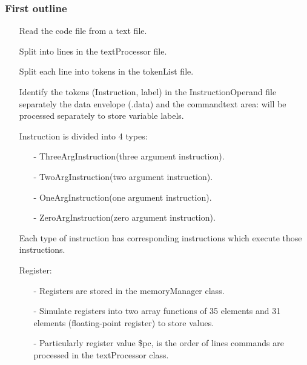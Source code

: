 \documentclass[10pt]{article}
\begin{document}
\begin{large}
    	\subsubsection{First outline}
    	    \begin{itemize}
            	\item[]
            	    Read the code file from a text file.
            	\item[]
            	    Split into lines in the textProcessor file.
            	\item[]
            	    Split each line into tokens in the tokenList file.
            	\item[]
            	    Identify the tokens (Instruction, label) in the InstructionOperand file separately the data envelope (.data) and the commandtext area: will be processed separately to store variable labels.
            	\item[]
            	    Instruction is divided into 4 types:
            	\begin{itemize}
                	\item[-]
                	    ThreeArgInstruction(three argument instruction).
                	\item[-]
                	    TwoArgInstruction(two argument instruction).
                	\item[-]
                	    OneArgInstruction(one argument instruction).
                	\item[-]
                	    ZeroArgInstruction(zero argument instruction).
            	\end{itemize}
            	\item[]
            	    Each type of instruction has corresponding instructions which execute those instructions.
            	\item[]
            	    Register:
            	\begin{itemize}
                	\item[-]
                	    Registers are stored in the memoryManager class.
                	\item[-]
                	    Simulate registers into two array functions of 35 elements and 31 elements (floating-point register) to store values.
                	\item[-]
                	    Particularly register value \$pc, is the order of lines commands are processed in the textProcessor class.
            	\end{itemize}

\end{itemize}
\end{large}
\end{document}
